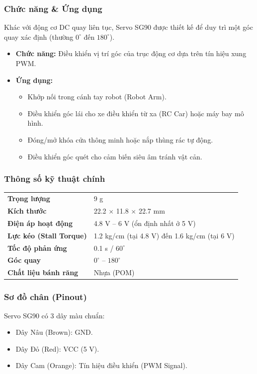 \documentclass[../BTL_PTIT.tex]{subfiles}
\begin{document}
\subsubsection{Chức năng \& Ứng dụng}
Khác với động cơ DC quay liên tục, Servo SG90 được thiết kế để duy trì một góc quay xác định (thường $0^\circ$ đến $180^\circ$).
\begin{itemize}[label=\textbullet]
    \item \textbf{Chức năng:} Điều khiển vị trí góc của trục động cơ dựa trên tín hiệu xung PWM.
    \item \textbf{Ứng dụng:}
    \begin{itemize}
        \item Khớp nối trong cánh tay robot (Robot Arm).
        \item Điều khiển góc lái cho xe điều khiển từ xa (RC Car) hoặc máy bay mô hình.
        \item Đóng/mở khóa cửa thông minh hoặc nắp thùng rác tự động.
        \item Điều khiển góc quét cho cảm biến siêu âm tránh vật cản.
    \end{itemize}
\end{itemize}

\subsubsection{Thông số kỹ thuật chính}
\begin{tabular}{lp{8.5cm}}
\textbf{Trọng lượng} & 9 g \\
\textbf{Kích thước} & 22.2 $\times$ 11.8 $\times$ 22.7 mm \\
\textbf{Điện áp hoạt động} & 4.8 V -- 6 V (ổn định nhất ở 5 V) \\
\textbf{Lực kéo (Stall Torque)} & 1.2 kg/cm (tại 4.8 V) đến 1.6 kg/cm (tại 6 V) \\
\textbf{Tốc độ phản ứng} & 0.1 s / $60^\circ$ \\
\textbf{Góc quay} & $0^\circ$ -- $180^\circ$ \\
\textbf{Chất liệu bánh răng} & Nhựa (POM)
\end{tabular}

\subsubsection{Sơ đồ chân (Pinout)}
Servo SG90 có 3 dây màu chuẩn:
\begin{itemize}
    \item Dây Nâu (Brown): GND.
    \item Dây Đỏ (Red): VCC (5 V).
    \item Dây Cam (Orange): Tín hiệu điều khiển (PWM Signal).
\end{itemize}
\end{document}
